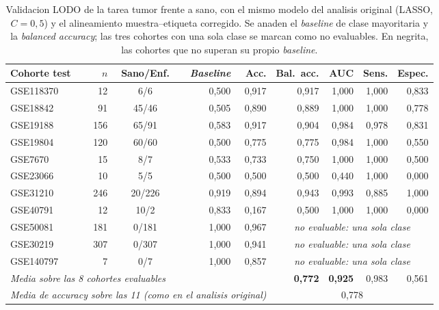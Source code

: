 \begin{table}[htbp]
\centering
\caption[Validacion LODO con metricas completas]{Validacion LODO de la tarea
tumor frente a sano, con el mismo modelo del analisis original (LASSO, $C=0{,}5$)
y el alineamiento muestra--etiqueta corregido. Se anaden el \emph{baseline} de
clase mayoritaria y la \emph{balanced accuracy}; las tres cohortes con una sola
clase se marcan como no evaluables. En negrita, las cohortes que no superan su
propio \emph{baseline}.}
\label{tab:lodo-honesto}
\small
\begin{tabular}{lrcrrrrrr}
\toprule
Cohorte test & $n$ & Sano/Enf. & \emph{Baseline} & Acc. & Bal.\ acc. & AUC & Sens. & Espec. \\
\midrule
GSE118370 & 12 & 6/6 & 0,500 & 0,917 & 0,917 & 1,000 & 1,000 & 0,833 \\
GSE18842 & 91 & 45/46 & 0,505 & 0,890 & 0,889 & 1,000 & 1,000 & 0,778 \\
GSE19188 & 156 & 65/91 & 0,583 & 0,917 & 0,904 & 0,984 & 0,978 & 0,831 \\
GSE19804 & 120 & 60/60 & 0,500 & 0,775 & 0,775 & 0,984 & 1,000 & 0,550 \\
GSE7670 & 15 & 8/7 & 0,533 & 0,733 & 0,750 & 1,000 & 1,000 & 0,500 \\
GSE23066 & 10 & 5/5 & 0,500 & 0,500 & 0,500 & 0,440 & 1,000 & 0,000 \\
GSE31210 & 246 & 20/226 & 0,919 & 0,894 & 0,943 & 0,993 & 0,885 & 1,000 \\
GSE40791 & 12 & 10/2 & 0,833 & 0,167 & 0,500 & 1,000 & 1,000 & 0,000 \\
GSE50081 & 181 & 0/181 & 1,000 & 0,967 & \multicolumn{4}{c}{\emph{no evaluable: una sola clase}} \\
GSE30219 & 307 & 0/307 & 1,000 & 0,941 & \multicolumn{4}{c}{\emph{no evaluable: una sola clase}} \\
GSE140797 & 7 & 0/7 & 1,000 & 0,857 & \multicolumn{4}{c}{\emph{no evaluable: una sola clase}} \\
\midrule
\multicolumn{5}{l}{\emph{Media sobre las 8 cohortes evaluables}} &
\textbf{0,772} &
\textbf{0,925} &
0,983 & 0,561 \\
\multicolumn{5}{l}{\emph{Media de \emph{accuracy} sobre las 11 (como en el analisis original)}} &
\multicolumn{4}{c}{0,778} \\
\bottomrule
\end{tabular}
\end{table}
